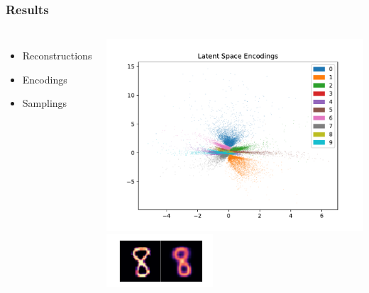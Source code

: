 \documentclass[10pt, usenames, dvipsnames, table]{beamer}
\begin{document}
\begin{frame}
  \frametitle{Results}
  \begin{columns}
    \begin{itemize}
    \item Reconstructions
    \item Encodings
    \item Samplings
    \end{itemize}
    \vspace{1em}
    \includegraphics[width=\linewidth]
    {models/mnist_conv_e300_L2_b64/encodings}
    \centering
    \includegraphics[width=\linewidth]
    {models/mnist_conv_e300_L2_b64/reconstruction_1} \\
    \vspace{2em}

\end{columns}
\end{frame}
\end{document}
